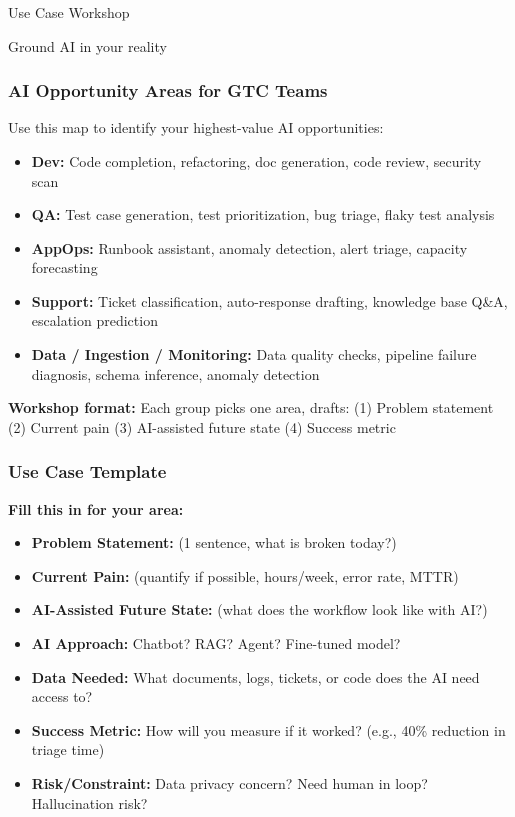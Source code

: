 \begin{frame}[fragile]\frametitle{}
\begin{center}
{\Large Use Case Workshop}

{\small Ground AI in your reality}
\end{center}
\end{frame}

\begin{frame}[fragile]\frametitle{AI Opportunity Areas for GTC Teams}
Use this map to identify your highest-value AI opportunities:
\begin{itemize}
\item \textbf{Dev:} Code completion, refactoring, doc generation, code review, security scan
\item \textbf{QA:} Test case generation, test prioritization, bug triage, flaky test analysis
\item \textbf{AppOps:} Runbook assistant, anomaly detection, alert triage, capacity forecasting
\item \textbf{Support:} Ticket classification, auto-response drafting, knowledge base Q\&A, escalation prediction
\item \textbf{Data / Ingestion / Monitoring:} Data quality checks, pipeline failure diagnosis, schema inference, anomaly detection
\end{itemize}
\textbf{Workshop format:} Each group picks one area, drafts: (1) Problem statement (2) Current pain (3) AI-assisted future state (4) Success metric
\end{frame}

\begin{frame}[fragile]\frametitle{Use Case Template}
\textbf{Fill this in for your area:}
\begin{itemize}
\item \textbf{Problem Statement:} (1 sentence, what is broken today?)
\item \textbf{Current Pain:} (quantify if possible, hours/week, error rate, MTTR)
\item \textbf{AI-Assisted Future State:} (what does the workflow look like with AI?)
\item \textbf{AI Approach:} Chatbot? RAG? Agent? Fine-tuned model?
\item \textbf{Data Needed:} What documents, logs, tickets, or code does the AI need access to?
\item \textbf{Success Metric:} How will you measure if it worked? (e.g., 40\% reduction in triage time)
\item \textbf{Risk/Constraint:} Data privacy concern? Need human in loop? Hallucination risk?
\end{itemize}
\end{frame}

